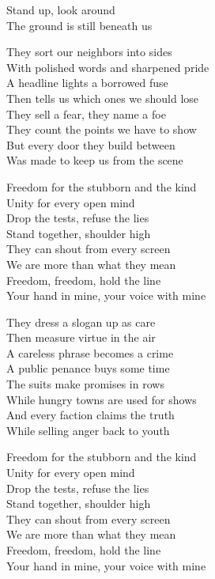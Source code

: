 \begin{lyrics}
Stand up, look around\\
The ground is still beneath us

They sort our neighbors into sides\\
With polished words and sharpened pride\\
A headline lights a borrowed fuse\\
Then tells us which ones we should lose\\
They sell a fear, they name a foe\\
They count the points we have to show\\
But every door they build between\\
Was made to keep us from the scene

Freedom for the stubborn and the kind\\
Unity for every open mind\\
Drop the tests, refuse the lies\\
Stand together, shoulder high\\
They can shout from every screen\\
We are more than what they mean\\
Freedom, freedom, hold the line\\
Your hand in mine, your voice with mine

They dress a slogan up as care\\
Then measure virtue in the air\\
A careless phrase becomes a crime\\
A public penance buys some time\\
The suits make promises in rows\\
While hungry towns are used for shows\\
And every faction claims the truth\\
While selling anger back to youth

Freedom for the stubborn and the kind\\
Unity for every open mind\\
Drop the tests, refuse the lies\\
Stand together, shoulder high\\
They can shout from every screen\\
We are more than what they mean\\
Freedom, freedom, hold the line\\
Your hand in mine, your voice with mine


\end{lyrics}
